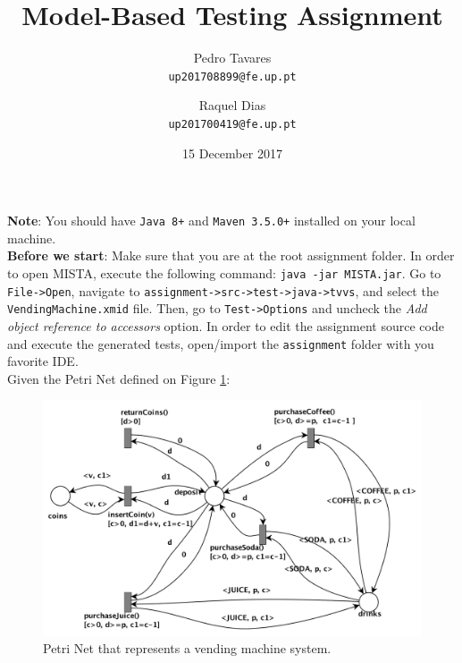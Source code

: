 \documentclass[11pt]{article}
\date{15 December 2017}
\begin{document}
\author{Pedro Tavares \\ \texttt{up201708899@fe.up.pt} \and Raquel Dias \\ \texttt{up201700419@fe.up.pt} }
\title{Model-Based Testing Assignment}

\maketitle

\textbf{Note}: You should have \texttt{Java 8+} and \texttt{Maven 3.5.0+} installed on your local machine. \\

\textbf{Before we start}: Make sure that you are at the root assignment folder.
In order to open MISTA, execute the following command: \texttt{java -jar MISTA.jar}. Go to \texttt{File->Open}, navigate to \texttt{assignment->src->test->java->tvvs}, and select the \texttt{VendingMachine.xmid} file. Then, go to \texttt{Test->Options} and uncheck the \textit{Add object reference to accessors} option. In order to edit the assignment source code and execute the generated tests, open/import the \texttt{assignment} folder with you favorite IDE.\\

Given the Petri Net defined on Figure \ref{fig:petri-net}:

\begin{figure}[!htb]
    \centering
    \includegraphics[scale=0.65]{petri-net.png}
    \caption{Petri Net that represents a vending machine system.}
    \label{fig:petri-net}
\end{figure}
\end{document}
